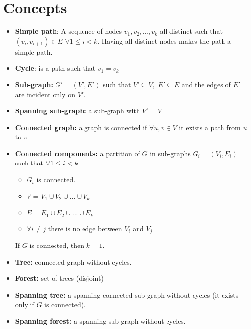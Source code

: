 \section{Concepts}
\begin{itemize}
    \item \textbf{Simple path}: A sequence of nodes $v_{1}, v_{2}, ..., v_{k}$ all distinct such that $(v_{i}, v_{i + 1}) \in E \,\, \forall 1 \leq i < k$. Having all distinct nodes makes the path a simple path. 

    \item \textbf{Cycle}: is a path such that $v_{1} = v_{k}$

    \item \textbf{Sub-graph:} $G' = (V', E')$ such that $V' \subseteq V, \,\, E' \subseteq E$ and the edges of $E'$ are incident only on $V'$.

    \item \textbf{Spanning sub-graph:} a sub-graph with $V' = V$

    \item \textbf{Connected graph:} a graph is connected if $\forall u, v \in V$ it exists a path from $u$ to $v$.

    \item \textbf{Connected components:} a partition of $G$ in sub-graphs $G_{i} = (V_{i}, E_{i})$ such that $\forall 1 \leq i < k$ 
    \begin{itemize}
        \item $G_{i}$ is connected.
        \item $V$ = $V_{1} \cup V_{2} \cup ... \cup V_{k}$
        \item $E = E_{1} \cup E_{2} \cup... \cup E_{k}$
        \item $\forall i \neq j$ there is no edge between $V_{i}$ and $V_{j}$
    \end{itemize}
    If $G$ is connected, then $k = 1$.

    \item \textbf{Tree:} connected graph without cycles.

    \item \textbf{Forest:} set of trees (disjoint)

    \item \textbf{Spanning tree:} a spanning connected sub-graph without cycles (it exists only if $G$ is connected).

    \item \textbf{Spanning forest:} a spanning sub-graph without cycles.
\end{itemize}


